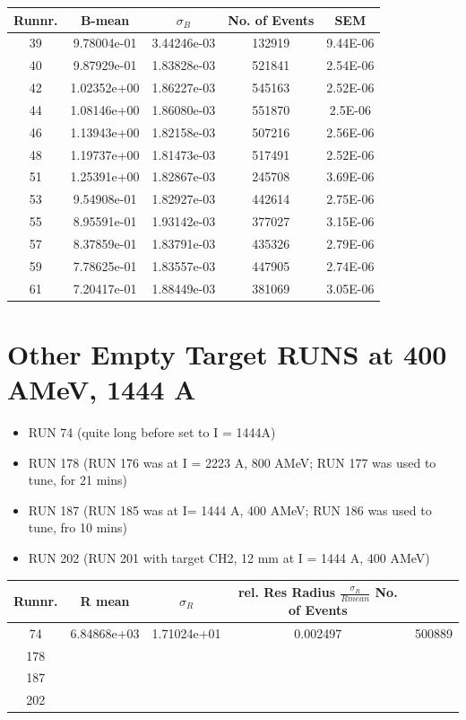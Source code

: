 \documentclass[12pt, letterpaper]{article}
\begin{document}
\begin{tabular}{|c|c|c|c|c|}
\hline
Runnr. & B-mean & $\sigma_{B}$ & No. of Events & SEM \\
\hline
39		&	9.78004e-01 &	3.44246e-03	&	132919	& 9.44E-06 \\
40		&	9.87929e-01	&	1.83828e-03	&	521841	& 2.54E-06 \\
42		&	1.02352e+00	&	1.86227e-03	&	545163	& 2.52E-06 \\
44		& 	1.08146e+00	&	1.86080e-03 &	551870	& 2.5E-06\\
46		&	1.13943e+00	&	1.82158e-03	& 	507216	& 2.56E-06\\
48		&	1.19737e+00	&	1.81473e-03	&	517491	& 2.52E-06\\
51		&	1.25391e+00 &	1.82867e-03	&	245708	& 3.69E-06\\
53		&	9.54908e-01	&	1.82927e-03	&	442614	& 2.75E-06\\
55		&	8.95591e-01	&	1.93142e-03	&	377027	& 3.15E-06\\
57		& 	8.37859e-01	&	1.83791e-03	&	435326	& 2.79E-06\\
59		&   7.78625e-01	&	1.83557e-03	&	447905	& 2.74E-06\\
61		&	7.20417e-01	&	1.88449e-03	&	381069	& 3.05E-06\\

\hline

\end{tabular}

\section{Other Empty Target RUNS at 400 AMeV, 1444 A}
\begin{itemize}
\item RUN 74 (quite long before set to I = 1444A)
\item RUN 178 (RUN 176 was at I = 2223 A, 800 AMeV; RUN 177 was used to tune, for 21 mins)
\item RUN 187 (RUN 185 was at I= 1444 A, 400 AMeV; RUN 186 was used to tune, fro 10 mins)
\item RUN 202 (RUN 201 with target CH2, 12 mm at I = 1444 A, 400 AMeV)
\end{itemize}

\begin{tabular}{|c|c|c|c|c|}
\hline
Runnr. & R mean & $\sigma_{R}$ & rel. Res Radius $\frac{\sigma_{R}}{R mean}$ No. of Events\\
\hline
74		&	6.84868e+03 	&	1.71024e+01	& 0.002497 &	500889 \\
178		&		&		&	 \\
187 	&		&		&	 \\
202		& 		&		&	 \\


\hline

\end{tabular}
\end{document}
